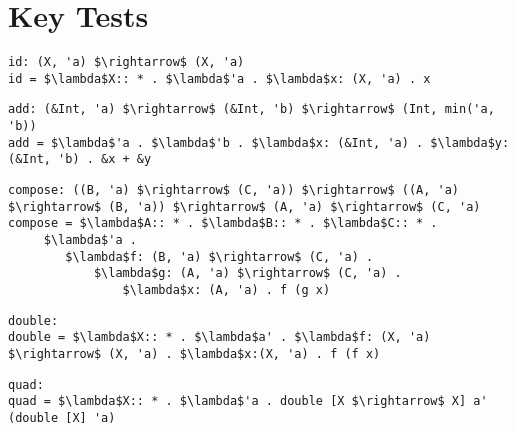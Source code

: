 \chapter{Key Tests}\label{sec:testing}

\begin{lstlisting}[mathescape, caption={Identity function}, label={lst:id}]
id: (X, 'a) $\rightarrow$ (X, 'a)
id = $\lambda$X:: * . $\lambda$'a . $\lambda$x: (X, 'a) . x
\end{lstlisting}

\begin{lstlisting}[mathescape, caption={Addition of two references}, label={lst:add}]
add: (&Int, 'a) $\rightarrow$ (&Int, 'b) $\rightarrow$ (Int, min('a, 'b))
add = $\lambda$'a . $\lambda$'b . $\lambda$x: (&Int, 'a) . $\lambda$y: (&Int, 'b) . &x + &y
\end{lstlisting}

\begin{lstlisting}[mathescape, caption={Function composition}, label={lst:compose}]
compose: ((B, 'a) $\rightarrow$ (C, 'a)) $\rightarrow$ ((A, 'a) $\rightarrow$ (B, 'a)) $\rightarrow$ (A, 'a) $\rightarrow$ (C, 'a)
compose = $\lambda$A:: * . $\lambda$B:: * . $\lambda$C:: * .
     $\lambda$'a .
        $\lambda$f: (B, 'a) $\rightarrow$ (C, 'a) .
            $\lambda$g: (A, 'a) $\rightarrow$ (C, 'a) .
                $\lambda$x: (A, 'a) . f (g x)
\end{lstlisting}

\begin{lstlisting}[mathescape, caption={Double Function application}, label={lst:double}]
double: 
double = $\lambda$X:: * . $\lambda$a' . $\lambda$f: (X, 'a) $\rightarrow$ (X, 'a) . $\lambda$x:(X, 'a) . f (f x)
\end{lstlisting}

\begin{lstlisting}[mathescape, caption={Quadruple application function using double}, label={lst:quad}]
quad: 
quad = $\lambda$X:: * . $\lambda$'a . double [X $\rightarrow$ X] a' (double [X] 'a)
\end{lstlisting}
